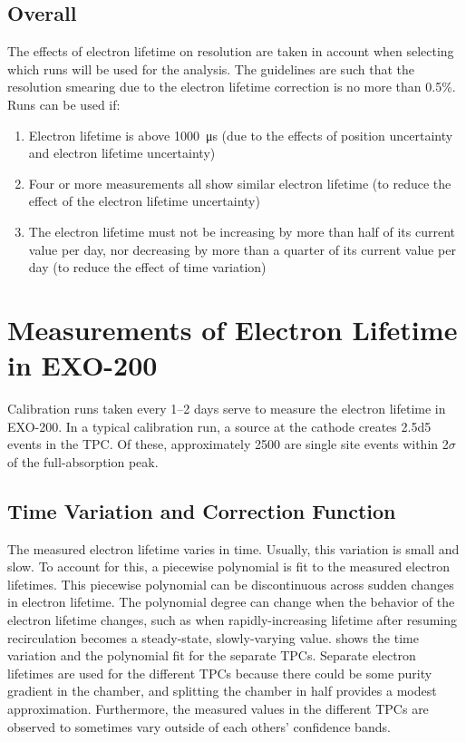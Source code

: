 \documentclass[herrin-thesis.tex]{subfiles}
\begin{document}
\subsection{Overall}
The effects of electron lifetime on resolution are taken in account when selecting which runs will be used for the analysis. The guidelines are such that the resolution smearing due to the electron lifetime correction is no more than 0.5\%. Runs can be used if:
\begin{enumerate}
\item Electron lifetime is above \SI{1000}{\micro\second} (due to the effects of position uncertainty and electron lifetime uncertainty)
\item Four or more measurements all show similar electron lifetime (to reduce the effect of the electron lifetime uncertainty)
\item The electron lifetime must not be increasing by more than half of its current value per day, nor decreasing by more than a quarter of its current value per day (to reduce the effect of time variation)
\end{enumerate}

\section{Measurements of Electron Lifetime in EXO-200}

Calibration runs taken every 1--2 days serve to measure the electron lifetime in EXO-200. In a typical calibration run, a  source at the cathode creates \num{2.5d5} events in the TPC. Of these, approximately 2500 are single site events within 2\(\sigma\) of the full-absorption peak.

\subsection{Time Variation and Correction Function}

The measured electron lifetime varies in time. Usually, this variation is small and slow. To account for this, a piecewise polynomial is fit to the measured electron lifetimes. This piecewise polynomial can be discontinuous across sudden changes in electron lifetime. The polynomial degree can change when the behavior of the electron lifetime changes, such as when rapidly-increasing lifetime after resuming recirculation becomes a steady-state, slowly-varying value.  shows the time variation and the polynomial fit for the separate TPCs. Separate electron lifetimes are used for the different TPCs because there could be some purity gradient in the chamber, and splitting the chamber in half provides a modest approximation. Furthermore, the measured values in the different TPCs are observed to sometimes vary outside of each others' confidence bands.
\end{document}
